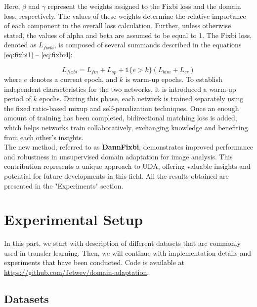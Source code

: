 Here, $\beta$ and $\gamma$ represent the weights assigned to the Fixbi loss and the domain loss, respectively. The values of these weights determine the relative importance of each component in the overall loss calculation. Further, unless otherwise stated, the values of alpha and beta are assumed to be equal to 1. The Fixbi loss, denoted as $L_{fixbi}$, is composed of several summands described in the  equations \ref{eq:fixbi1} -- \ref{eq:fixbi4}: 

\begin{equation}
L_{fixbi} = L_{fm} + L_{sp} + \mathds{1}\{e > k\} \left(L_{bim} + L_{cr}\right)
\end{equation}
where $e$ denotes a current epoch, and $k$ is  warm-up epochs. To establish independent characteristics for the two networks, it is introduced a warm-up period of $k$ epochs. During this phase, each network is trained separately using the fixed ratio-based mixup and self-penalization techniques. Once an enough amount of training has been completed, bidirectional matching loss is added, which helps networks train collaboratively, exchanging knowledge and benefiting from each other's insights. \\

The new method, referred to as \textbf{DannFixbi}, demonstrates improved performance and robustness in unsupervised domain adaptation for image analysis. This contribution represents a unique approach to UDA, offering valuable insights and potential for future developments in this field. All the results obtained are presented in the "Experiments" section.

\newpage
{}
\section{Experimental Setup} \label{section: copy me}

In this part, we start with description of different datasets that are commonly used in transfer learning. Then, we will continue with implementation details and experiments that have been conducted. Code is available at \href{https://github.com/Jetwev/domain-adaptation}{https://github.com/Jetwev/domain-adaptation}.

\subsection{Datasets}

